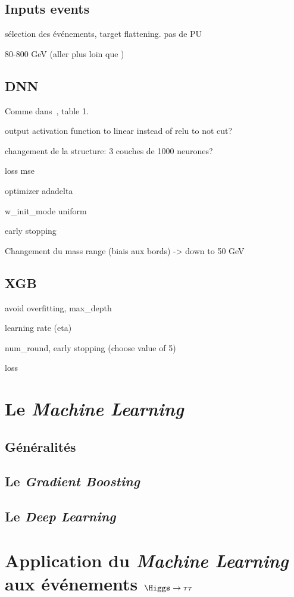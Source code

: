 \subsection*{Inputs events}
sélection des événements, target flattening. pas de PU

80-800 GeV (aller plus loin que \cite{BARTSCHI201929})
\subsection*{DNN}
Comme dans~\cite{BARTSCHI201929}, table 1.

output activation function to linear instead of relu to not cut?

changement de la structure: 3 couches de 1000 neurones?

loss mse

optimizer adadelta

w\_init\_mode uniform

early stopping

Changement du mass range (biais aux bords) -> down to 50 GeV

\subsection*{XGB}
avoid overfitting, max\_depth

learning rate (eta)

num\_round, early stopping (choose value of 5)

loss



\section{Le \emph{Machine Learning}}
\subsection{Généralités}
\subsection{Le \emph{Gradient Boosting}}
\subsection{Le \emph{Deep Learning}}

\section{Application du \emph{Machine Learning} aux événements $\Higgs\to\tau\tau$}
